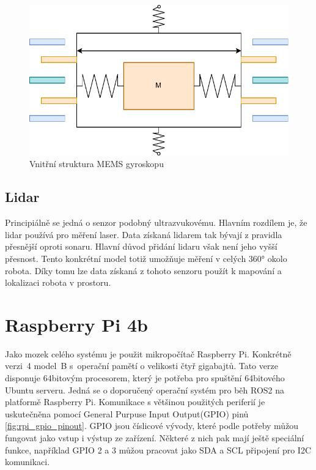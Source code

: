 \begin{figure}[h!]
	\centering
	\includegraphics[scale=0.8]{obrazky-figures/gyroscope.pdf}
	\caption{Vnitřní struktura MEMS gyroskopu}
	\label{fig:mems_gyro}
\end{figure}

\subsection*{Lidar}
Principiálně se jedná o senzor podobný ultrazvukovému. Hlavním rozdílem je, že lidar používá pro měření laser. Data získaná lidarem tak bývají z pravidla přesnější oproti sonaru. Hlavní důvod přidání lidaru však není jeho vyšší přesnost. Tento konkrétní model totiž umožňuje měření v celých 360° okolo robota. Díky tomu lze data získaná z tohoto senzoru použít k mapování a lokalizaci robota v prostoru. \cite[str:~96-98]{embeded_robotics}

\section{Raspberry Pi 4b}
Jako mozek celého systému je použit mikropočítač Raspberry Pi. Konkrétně verzi~4 model~B s~operační pamětí o velikosti čtyř gigabajtů. Tato verze disponuje 64bitovým procesorem, který je potřeba pro spuštění 64bitového Ubuntu serveru. Jedná se o doporučený operační systém pro běh ROS2 na platformě Raspberry Pi.
Komunikace s většinou použitých periferií je uskutečněna pomocí General Purpuse Input Output(GPIO) pinů \ref{fig:rpi_gpio_pinout}. GPIO jsou číslicové vývody, které podle potřeby můžou fungovat jako vstup i výstup ze zařízení. Některé z nich pak mají ještě speciální funkce, například GPIO 2 a 3 můžou pracovat jako SDA a SCL připojení pro I2C komunikaci. \cite{rpi_documentation}

